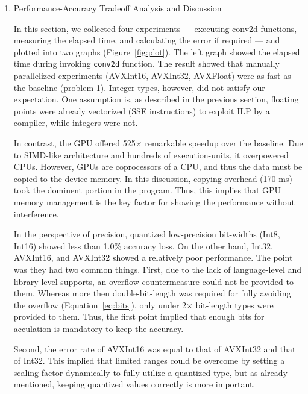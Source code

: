 \documentclass[a4paper,12pt]{article}
\begin{document}
\begin{enumerate}
		\item Performance-Accuracy Tradeoff Analysis and Discussion
			\begin{answer}

				In this section, we collected four experiments --- executing conv2d functions, measuring the elapsed time, and calculating the error if required --- and plotted into two graphs (Figure~\ref{fig:plot}).
				The left graph showed the elapsed time during invoking \lstinline{conv2d} function. 
				The result showed that manually parallelized experiments (AVXInt16, AVXInt32, AVXFloat) were as fast as the baseline (problem 1). 
				Integer types, however, did not satisfy our expectation. 
				One assumption is, as described in the previous section, floating points were already vectorized (SSE instructions) to exploit ILP by a compiler, while integers were not.

				In contrast, the GPU offered 525$\times$ remarkable speedup over the baseline.
				Due to SIMD-like architecture and hundreds of execution-units, it overpowered CPUs.
				However, GPUs are coprocessors of a CPU, and thus the data must be copied to the device memory. In this discussion, copying overhead (170 ms) took the dominent portion in the program. 
				Thus, this implies that GPU memory management is the key factor for showing the performance without interference.

				In the perspective of precision, quantized low-precision bit-widths (Int8, Int16) showed less than 1.0\% accuracy loss.
				On the other hand, Int32, AVXInt16, and AVXInt32 showed a relatively poor performance.
				The point was they had two common things.
				First, due to the lack of language-level and library-level supports, an overflow countermeasure could not be provided to them.
				Whereas more then double-bit-length was required for fully avoiding the overflow (Equation~\ref{eq:bits}), only under 2$\times$ bit-length types were provided to them. 
				Thus, the first point implied that enough bits for acculation is mandatory to keep the accuracy.

				Second, the error rate of AVXInt16 was equal to that of AVXInt32 and that of Int32. 
				This implied that limited ranges could be overcome by setting a scaling factor dynamically to fully utilize a quantized type, but as already mentioned, keeping quantized values correctly is more important.


\end{answer}
\end{enumerate}
\end{document}
